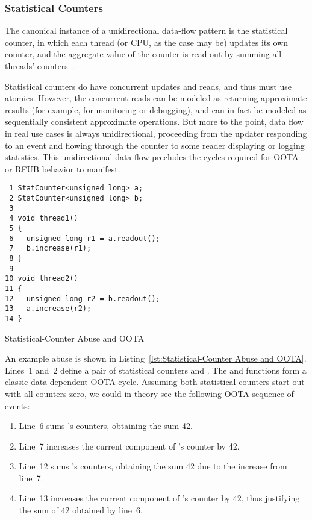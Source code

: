 \documentclass[10]{article}
\begin{document}
\subsubsection{Statistical Counters}
\label{sec:Statistical Counters}

The canonical instance of a unidirectional data-flow pattern is the
statistical counter, in which each thread (or CPU, as the case may be)
updates its own counter, and the aggregate value of the counter is read
out by summing all threads'
counters~\cite[Section 5.2]{McKenney2018ParallelProgramming-2018-12-08a}.

Statistical counters do have concurrent updates and reads, and thus must
use atomics.
However, the concurrent reads can be modeled as returning approximate
results (for example, for monitoring or debugging), and can in fact be
modeled as sequentially consistent approximate operations.
But more to the point, data flow in real use cases is always
unidirectional, proceeding from the updater responding to an event
and flowing through the counter to some reader displaying or logging
statistics.
This unidirectional data flow precludes the cycles required for OOTA or
RFUB behavior to manifest.

\begin{listing}[tbp]
\begin{verbatim}
 1 StatCounter<unsigned long> a;
 2 StatCounter<unsigned long> b;
 3
 4 void thread1()
 5 {
 6   unsigned long r1 = a.readout();
 7   b.increase(r1);
 8 }
 9
10 void thread2()
11 {
12   unsigned long r2 = b.readout();
13   a.increase(r2);
14 }
\end{verbatim}
\caption{Statistical-Counter Abuse and OOTA}
\label{lst:Statistical-Counter Abuse and OOTA}
\end{listing}

An example abuse is shown in
Listing~\ref{lst:Statistical-Counter Abuse and OOTA}.
Lines~1 and~2 define a pair of statistical counters  and .
The  and  functions form a classic
data-dependent OOTA cycle.
Assuming both statistical counters start out with all counters zero,
we could in theory see the following OOTA sequence of events:

\begin{enumerate}
\item	Line~6 sums 's counters, obtaining the sum 42.
\item	Line~7 increases the current component of 's counter by 42.
\item	Line~12 sums 's counters, obtaining the sum 42 due to the
	increase from line~7.
\item	Line~13 increases the current component of 's counter by 42,
	thus justifying the sum of 42 obtained by line~6.
\end{enumerate}
\end{document}
